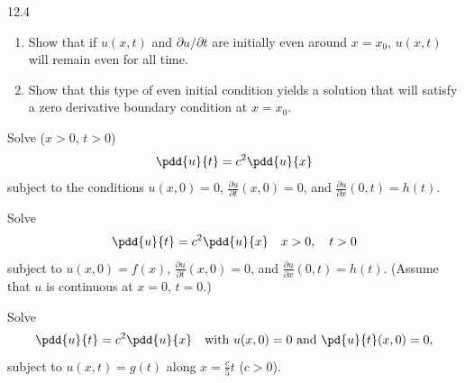\begin{exercises}{12.4}
\item \label{ex:12.4.5}
\begin{enumerate}
\item[(a)] Show that if $u(x,t)$ and $\partial u/\partial t$ are initially even around $x = x_0$, $u(x,t)$ will remain even for all time.
\item[(b)] Show that this type of even initial condition yields a solution that will satisfy a zero derivative boundary condition at $x = x_0$.
\end{enumerate}

\item\starred \label{ex:12.4.6}
Solve ($x > 0$, $t > 0$)
\[
\pdd{u}{t} = c^2\pdd{u}{x}
\]
subject to the conditions $u(x,0) = 0$, $\frac{\partial u}{\partial t}(x,0) = 0$, and $\frac{\partial u}{\partial x}(0,t) = h(t)$.

\item\starred \label{ex:12.4.7}
Solve
\[
\pdd{u}{t} = c^2\pdd{u}{x} \quad x > 0, \quad t > 0
\]
subject to $u(x,0) = f(x)$, $\frac{\partial u}{\partial t}(x,0) = 0$, and $\frac{\partial u}{\partial x}(0,t) = h(t)$.  (Assume that $u$ is continuous at $x = 0$, $t = 0$.)

\item \label{ex:12.4.8}
Solve
\[
\pdd{u}{t} = c^2\pdd{u}{x} \quad \text{with } u(x,0) = 0 \text{ and } \pd{u}{t}(x,0) = 0,
\]
subject to $u(x,t) = g(t)$ along $x = \tfrac{c}{5}t$ ($c > 0$).

\end{exercises}
